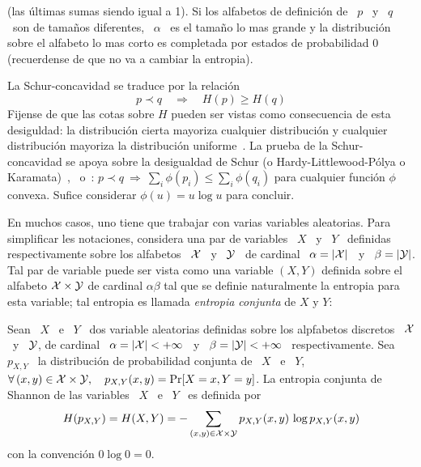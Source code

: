 \begin{propiedades}
\begin{definicion}[Mayorizaci\'on]
\[    \]
    (las \'ultimas sumas siendo igual a 1).  Si los alfabetos de definici\'on de
    \ $p$ \ y  \ $q$ \ son de tama\~nos diferentes, \  $\alpha$ \ es el tama\~no
    lo  mas  grande y  la  distribuci\'on  sobre el  alfabeto  lo  mas corto  es
    completada por estados de probabilidad 0 (recuerdense de que no va a cambiar
    la entropia).
  \end{definicion}
  La  Schur-concavidad  se  traduce  por  la  relaci\'on
  \[
  p \prec  q \quad \Rightarrow  \quad H(p) \ge  H(q)
  \]
  Fijense de que las cotas sobre $H$ pueden ser vistas como consecuencia de esta
  desiguldad:  la  distribuci\'on  cierta  mayoriza cualquier  distribuci\'on  y
  cualquier  distribuci\'on   mayoriza  la  distribuci\'on  uniforme~\cite[p.~9,
  (6)-(8)]{MarOlk11}.   La  prueba de  la  Schur-concavidad  se  apoya sobre  la
  desigualdad  de  Schur  (o Hardy-Littlewood-P\'olya  o  Karamata)~\cite{Sch23,
    HarLit29,      Kar32,      HarLit52},~\cite[Cap.~3,     Prop.~C.1]{MarOlk11}
  o~\cite[Teorema~II.3.1]{Bha97}: $p \prec q  \: \Rightarrow \: \sum_i \phi(p_i)
  \le  \sum_i  \phi(q_i)$  para  cualquier  funci\'on  $\phi$  convexa.   Sufice
  considerar $\phi(u) = u \log u$ para concluir.
\end{propiedades}
%


En muchos  casos, uno tiene que  trabajar con varias  variables aleatorias. Para
simplificar les  notaciones, considera una par  de variables \  $X$ \ y \  $Y$ \
definidas respectivamente sobre los alfabetos \ $\mathcal{X}$  \ y \ $\mathcal{Y}$ \ de cardinal \
$\alpha = |\mathcal{X}|$ \ y \ $\beta =  |\mathcal{Y}|$.  Tal par de variable puede ser vista como
una  variable $(X,Y)$  definida sobre  el alfabeto  $\mathcal{X} \times  \mathcal{Y}$  de cardinal
$\alpha \beta$ tal  que se definie naturalmente la  entropia para esta variable;
tal entropia es llamada {\it entropia conjunta} de $X$ y $Y$:
%
\begin{definicion}\label{def:SZ:EntropiaConjunta}
  Sean \ $X$ \ e \ $Y$  \ dos variable aleatorias definidas sobre los alpfabetos
  discretos \  $\mathcal{X}$ \ y \ $\mathcal{Y}$,  de cardinal \ $\alpha  = |\mathcal{X}| < +\infty$  \ y \
  $\beta  =   |\mathcal{Y}|  <  +\infty$  \   respectivamente.  Sea  \   $p_{X,Y}$  \  la
  distribuci\'on de probabilidad conjunta de \ $X$ \ e \ $Y$, \ \ie $ \forall \,
  (x,y) \in \mathcal{X} \times \mathcal{Y}, \quad p_{X,Y}(x,y) =  \Pr[X = x , Y = y]$. La entropia
  conjunta de Shannon de las variables \ $X$ \ e \ $Y$ \ es definida por
  \[
  H(p_{X,Y}) =  H(X,Y) = -  \sum_{(x,y) \in \mathcal{X}  \times \mathcal{Y}} p_{X,Y}(x,y)  \, \log
  p_{X,Y}(x,y)
  \]
  con la convenci\'on $0 \log 0 = 0$.
\end{definicion}

